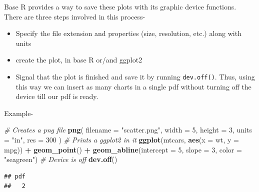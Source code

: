 \documentclass[
]{book}
\newenvironment{Shaded}{\begin{snugshade}}{\end{snugshade}}
\newcommand{\AttributeTok}[1]{\textcolor[rgb]{0.13,0.29,0.53}{#1}}
\newcommand{\CommentTok}[1]{\textcolor[rgb]{0.56,0.35,0.01}{\textit{#1}}}
\newcommand{\DecValTok}[1]{\textcolor[rgb]{0.00,0.00,0.81}{#1}}
\newcommand{\FunctionTok}[1]{\textcolor[rgb]{0.13,0.29,0.53}{\textbf{#1}}}
\newcommand{\NormalTok}[1]{#1}
\newcommand{\SpecialCharTok}[1]{\textcolor[rgb]{0.81,0.36,0.00}{\textbf{#1}}}
\newcommand{\StringTok}[1]{\textcolor[rgb]{0.31,0.60,0.02}{#1}}
\providecommand{\tightlist}{%
  \setlength{\itemsep}{0pt}\setlength{\parskip}{0pt}}
\begin{document}
Base R provides a way to save these plots with its graphic device functions. There are three steps involved in this process-

\begin{itemize}
\tightlist
\item
  Specify the file extension and properties (size, resolution, etc.) along with units
\item
  create the plot, in base R or/and ggplot2
\item
  Signal that the plot is finished and save it by running \texttt{dev.off()}. Thus, using this way we can insert as many charts in a single pdf without turning off the device till our pdf is ready.
\end{itemize}

Example-

\begin{Shaded}
\begin{Highlighting}[]
\CommentTok{\# Creates a png file}
\FunctionTok{png}\NormalTok{(}
  \AttributeTok{filename =} \StringTok{"scatter.png"}\NormalTok{,}
  \AttributeTok{width =} \DecValTok{5}\NormalTok{,}
  \AttributeTok{height =} \DecValTok{3}\NormalTok{,}
  \AttributeTok{units =} \StringTok{"in"}\NormalTok{,}
  \AttributeTok{res =} \DecValTok{300}
\NormalTok{)}
\CommentTok{\# Prints a ggplot2 in it}
\FunctionTok{ggplot}\NormalTok{(mtcars, }\FunctionTok{aes}\NormalTok{(}\AttributeTok{x =}\NormalTok{ wt, }\AttributeTok{y =}\NormalTok{ mpg)) }\SpecialCharTok{+}
  \FunctionTok{geom\_point}\NormalTok{() }\SpecialCharTok{+}
  \FunctionTok{geom\_abline}\NormalTok{(}\AttributeTok{intercept =} \DecValTok{5}\NormalTok{,}
              \AttributeTok{slope =} \DecValTok{3}\NormalTok{,}
              \AttributeTok{color =} \StringTok{"seagreen"}\NormalTok{)}
\CommentTok{\# Device is off}
\FunctionTok{dev.off}\NormalTok{()}
\end{Highlighting}
\end{Shaded}

\begin{verbatim}
## pdf 
##   2
\end{verbatim}
\end{document}
